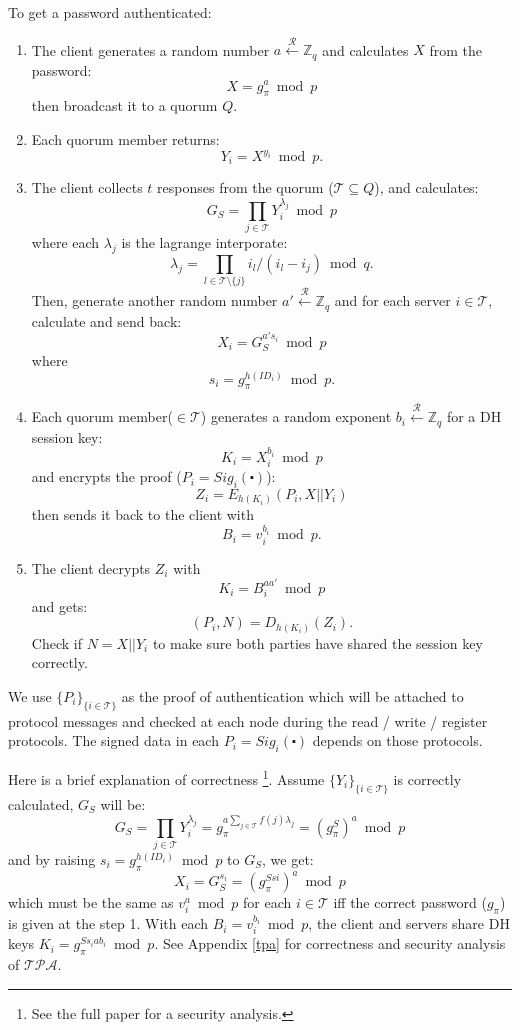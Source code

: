 To get a password authenticated:
\begin{enumerate}
\item The client generates a random number
  $a \xleftarrow{\mathcal{R}} \mathbb{Z}_q$
  and calculates $X$ from the password:
  \[
    X = g_{\pi}^a \bmod p
  \]
  then broadcast it to a quorum $Q$.

\item Each quorum member returns:
  \[
    Y_i = X^{y_i} \bmod p.
  \]

\item The client collects $t$ responses from the quorum ($\mathcal{T}
  \subseteq Q$), and
  calculates:
  \[
    G_S = \prod_{j \in \mathcal{T}}Y_i^{\lambda_j} \bmod p
  \]
  where each $\lambda_j$ is the lagrange interporate:
  \[
    \lambda_j = \prod_{l \in \mathcal{T} \setminus \{j\}}
    i_l / (i_l - i_j) \bmod q.
  \]
  Then, generate another random number $a' \xleftarrow{\mathcal{R}}
  \mathbb{Z}_q$ and for each server $i \in \mathcal{T}$, calculate and
  send back:
  \[
    X_i = G_S^{a's_i} \bmod p
  \]
  where
  \[
    s_i = g_{\pi}^{h(ID_i)} \bmod p.
  \]

\item Each quorum member($\in \mathcal{T}$) generates a random exponent
  $b_i \xleftarrow{\mathcal{R}} \mathbb{Z}_q$
  for a DH session key:
  \[ K_i = X_i^{b_i} \bmod p \]
  and encrypts the proof ($P_i = Sig_i(\centerdot)$):
  \[
    Z_i = E_{h(K_i)}(P_i, X || Y_i)
  \]
  then sends it back to the client with
  \[
    B_i = v_i^{b_i} \bmod p.
  \]

\item The client decrypts $Z_i$ with
  \[
    K_i = B_i^{aa'} \bmod p
  \]
  and gets:
  \[
    (P_i, N) = D_{h(K_i)}(Z_i).
  \]
  Check if $N = X||Y_i$ to make sure both parties have shared the
  session key correctly. 
\end{enumerate}
We use $\{P_i\}_{\{i \in \mathcal{T}\}}$ as the proof of
authentication which will be attached to protocol messages and checked
at each node during the {\sf read / write / register} protocols. The
signed data in each $P_i = Sig_i(\centerdot)$ depends on those
protocols.

\ifdefined\ABSTRACT
Here is a brief explanation of correctness
\footnote{See the full paper for a security analysis.}.
Assume $\{Y_i\}_{\{i \in \mathcal{T}\}}$ is correctly calculated,
$G_S$ will be:
\[
  G_S = \prod_{j \in \mathcal{T}}Y_i^{\lambda_j} = g_{\pi}^{a \sum_{j
      \in \mathcal{T}} f(j) \lambda_j} = (g_{\pi}^S)^a \bmod p
\]
and by raising $s_i = g_{\pi}^{h(ID_i)} \bmod p$ to $G_S$, we get:
\[
  X_i = G_S^{s_i} = (g_{\pi}^{Ssi})^a \bmod p
\]
which must be the same as $v_i^a \bmod p$ for each $i \in
\mathcal{T}$ iff the correct password ($g_{\pi}$) is given at the
step 1. With each $B_i = v_i^{b_i} \bmod p$, the client and servers
share DH keys $K_i = g_{\pi}^{Ss_iab_i} \bmod p$.
\else
See Appendix \ref{tpa} for correctness and security analysis of
$\mathcal{TPA}$.
\fi

